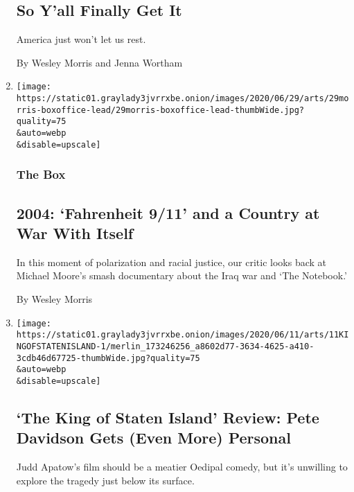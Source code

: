 \begin{enumerate}
  \hypertarget{so-yall-finally-get-it}{%
  \subsection{So Y'all Finally Get It}\label{so-yall-finally-get-it}}

  America just won't let us rest.

  By Wesley Morris and Jenna Wortham
\item
  \href{/2020/06/30/movies/fahrenheit-911-movie-2004.html}{}

  \texttt{[image: https://static01.graylady3jvrrxbe.onion/images/2020/06/29/arts/29morris-boxoffice-lead/29morris-boxoffice-lead-thumbWide.jpg?quality=75\\\&auto=webp\\\&disable=upscale]}

  \hypertarget{the-box}{%
  \subsubsection{The Box}\label{the-box}}

  \hypertarget{2004-fahrenheit-911-and-a-country-at-war-with-itself}{%
  \subsection{2004: `Fahrenheit 9/11' and a Country at War With
  Itself}\label{2004-fahrenheit-911-and-a-country-at-war-with-itself}}

  In this moment of polarization and racial justice, our critic looks
  back at Michael Moore's smash documentary about the Iraq war and `The
  Notebook.'

  By Wesley Morris
\item
  \href{/2020/06/11/movies/the-king-of-staten-island-review.html}{}

  \texttt{[image: https://static01.graylady3jvrrxbe.onion/images/2020/06/11/arts/11KINGOFSTATENISLAND-1/merlin\_173246256\_a8602d77-3634-4625-a410-3cdb46d67725-thumbWide.jpg?quality=75\\\&auto=webp\\\&disable=upscale]}

  \hypertarget{the-king-of-staten-island-review-pete-davidson-gets-even-more-personal}{%
  \subsection{`The King of Staten Island' Review: Pete Davidson Gets
  (Even More)
  Personal}\label{the-king-of-staten-island-review-pete-davidson-gets-even-more-personal}}

  Judd Apatow's film should be a meatier Oedipal comedy, but it's
  unwilling to explore the tragedy just below its surface.


\end{enumerate}
